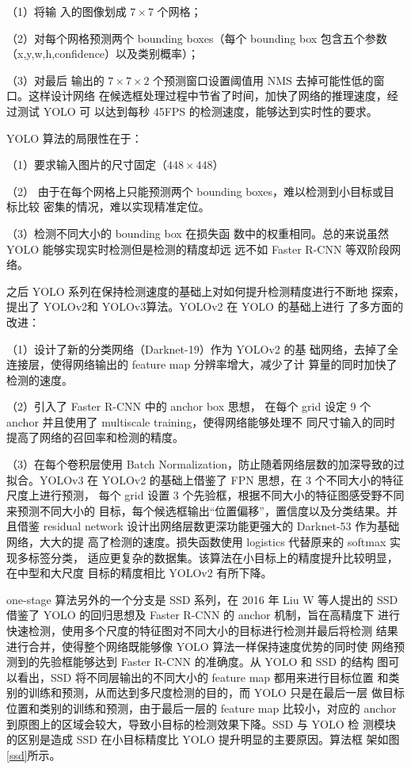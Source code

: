 （1）将输
入的图像划成 $7 \times 7$ 个网格；

（2）对每个网格预测两个 bounding boxes（每个
bounding box 包含五个参数（x,y,w,h,confidence）以及类别概率）；

（3）对最后
输出的 $7 \times 7 \times 2$ 个预测窗口设置阈值用 NMS 去掉可能性低的窗口。这样设计网络
在候选框处理过程中节省了时间，加快了网络的推理速度，经过测试 YOLO 可
以达到每秒 45FPS 的检测速度，能够达到实时性的要求。

YOLO 算法的局限性在于：

（1）要求输入图片的尺寸固定（$448 \times 448$）

（2）
由于在每个网格上只能预测两个 bounding boxes，难以检测到小目标或目标比较
密集的情况，难以实现精准定位。

（3）检测不同大小的 bounding box 在损失函
数中的权重相同。总的来说虽然 YOLO 能够实现实时检测但是检测的精度却远
远不如 Faster R-CNN 等双阶段网络。

之后 YOLO 系列在保持检测速度的基础上对如何提升检测精度进行不断地
探索，提出了 YOLOv2\cite{redmon2017yolo9000}和 YOLOv3\cite{redmon2018yolov3}算法。YOLOv2 在 YOLO 的基础上进行
了多方面的改进：

（1）设计了新的分类网络（Darknet-19）作为 YOLOv2 的基
础网络，去掉了全连接层，使得网络输出的 feature map 分辨率增大，减少了计
算量的同时加快了检测的速度。

（2）引入了 Faster R-CNN 中的 anchor box 思想，
在每个 grid 设定 9 个 anchor 并且使用了 multiscale training，使得网络能够处理不
同尺寸输入的同时提高了网络的召回率和检测的精度。

（3）在每个卷积层使用
Batch Normalization，防止随着网络层数的加深导致的过拟合。YOLOv3 在
YOLOv2 的基础上借鉴了 FPN 思想，在 3 个不同大小的特征尺度上进行预测，
每个 grid 设置 3 个先验框，根据不同大小的特征图感受野不同来预测不同大小的
目标，每个候选框输出“位置偏移”，置信度以及分类结果。并且借鉴 residual
network 设计出网络层数更深功能更强大的 Darknet-53 作为基础网络，大大的提
高了检测的速度。损失函数使用 logistics 代替原来的 softmax 实现多标签分类，
适应更复杂的数据集。该算法在小目标上的精度提升比较明显，在中型和大尺度
目标的精度相比 YOLOv2 有所下降。

one-stage 算法另外的一个分支是 SSD 系列，在 2016 年 Liu W 等人提出的
SSD\cite{liu2016ssd}借鉴了 YOLO 的回归思想及 Faster R-CNN 的 anchor 机制，旨在高精度下
进行快速检测，使用多个尺度的特征图对不同大小的目标进行检测并最后将检测
结果进行合并，使得整个网络既能够像 YOLO 算法一样保持速度优势的同时使
网络预测到的先验框能够达到 Faster R-CNN 的准确度。从 YOLO 和 SSD 的结构
图可以看出，SSD 将不同层输出的不同大小的 feature map 都用来进行目标位置
和类别的训练和预测，从而达到多尺度检测的目的，而 YOLO 只是在最后一层
做目标位置和类别的训练和预测，由于最后一层的 feature map 比较小，对应的
anchor 到原图上的区域会较大，导致小目标的检测效果下降。SSD 与 YOLO 检
测模块的区别是造成 SSD 在小目标精度比 YOLO 提升明显的主要原因。算法框
架如图\ref{ssd}所示。

